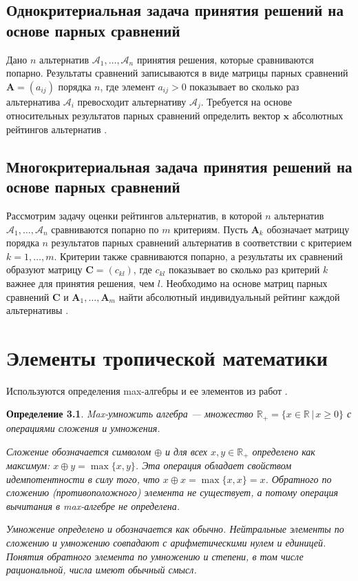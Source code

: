 \documentclass[specialist, substylefile = spbureport.rtx,
    subf,href,colorlinks=true, 12pt]{disser}
\newtheorem*{definition}{Определение}
\begin{document}
    \section{Однокритериальная задача принятия решений на основе парных сравнений}
        Дано $n$ альтернатив $\mathcal{A}_{1},\ldots,\mathcal{A}_{n}$ принятия решения, которые сравниваются попарно. Результаты сравнений записываются в виде матрицы парных сравнений $\bm{A}=(a_{ij})$ порядка $n$, где элемент $a_{ij}>0$ показывает во сколько раз альтернатива $\mathcal{A}_{i}$ превосходит альтернативу $\mathcal{A}_{j}$. Требуется на основе относительных результатов парных сравнений определить вектор $\bm{x}$ абсолютных рейтингов альтернатив \cite{Krivulin2020Reshenie}.

    \section{Многокритериальная задача принятия решений на основе парных сравнений}
        Рассмотрим задачу оценки рейтингов альтернатив, в которой $n$ альтернатив $\mathcal{A}_{1},\ldots,\mathcal{A}_{n}$ сравниваются попарно по $m$ критериям. Пусть $\bm{A}_{k}$ обозначает матрицу порядка $n$ результатов парных сравнений альтернатив в соответствии с критерием $k=1,\ldots,m$. Критерии также сравниваются попарно, а результаты их сравнений образуют матрицу $\bm{C}=(c_{kl})$, где $c_{kl}$ показывает во сколько раз критерий $k$ важнее для принятия решения, чем $l$. Необходимо на основе матриц парных сравнений $\bm{C}$ и $\bm{A}_{1},\ldots,\bm{A}_{m}$ найти абсолютный индивидуальный рейтинг каждой альтернативы \cite{Krivulin2020Reshenie}.


    \chapter{Элементы тропической математики}

    Используются определения max-алгебры и ее элементов из работ \cite{Krivulin2020Reshenie, Krivulin2019Metody}.

    \begin{definition}
        Max-умножить алгебра --- множество $\mathbb{R}_+ = \{x \in \mathbb{R} \, |\, x \geq 0\}$ с операциями сложения и умножения.

        Сложение обозначается символом $\oplus$ и для всех $x,y\in\mathbb{R}_{+}$ определено как максимум: $x\oplus y=\max\{x,y\}$. Эта операция обладает свойством идемпотентности в силу того, что ${x\oplus x=\max\{x,x\}=x}$. Обратного по сложению (противоположного) элемента не существует, а потому операция вычитания в max-алгебре не определена.

        Умножение определено и обозначается как обычно. Нейтральные элементы по сложению и умножению совпадают с арифметическими нулем и единицей. Понятия обратного элемента по умножению и степени, в том числе рациональной, числа имеют обычный смысл. 
    \end{definition}
        
\end{document}
